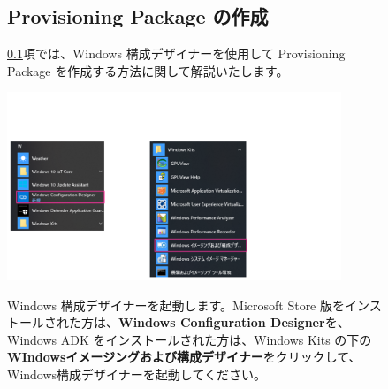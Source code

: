 \newpage

\begin{figure}[htbp]
    \subsection{Provisioning Package の作成}
    \label{sec:ProvisioningPackageの作成}

    \hspace{8pt} \ref{sec:ProvisioningPackageの作成}項では、Windows 構成デザイナーを使用して Provisioning Package を作成する方法に関して解説いたします。
\end{figure}

\begin{figure}[hp]
    \begin{minipage}{0.6\textwidth}
        \vspace{-1.5cm}
        \includegraphics[width=10cm]{figures/MakeProvisioningPackage-01}
    \end{minipage}
    \begin{minipage}{0.4\textwidth}
        Windows 構成デザイナーを起動します。Microsoft Store 版をインストールされた方は、\textbf{Windows Configuration Designer}を、Windows ADK をインストールされた方は、Windows Kits の下の\textbf{WIndowsイメージングおよび構成デザイナー}をクリックして、Windows構成デザイナーを起動してください。
    \end{minipage}
\end{figure}

